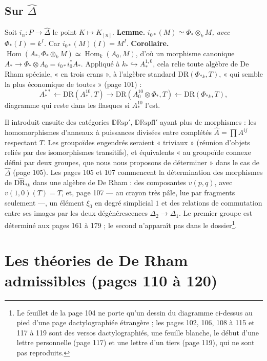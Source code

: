 \documentclass[11pt,a4paper]{article}
\begin{document}
\subsection*{Sur $\widehat{\Delta}$}

Soit $i_n : P \to \widehat{\Delta}$ le point $K \mapsto K_{[n]}$.
\textbf{Lemme.} \emph{$i_{0*}(M) \simeq \Phi_* \otimes_k M$, avec $\Phi_*(I) =
k^I$.} Car $i_{0*}(M)(I) = M^I$. \textbf{Corollaire.}
$\operatorname{Hom}(A_*, \Phi_* \otimes_k M) \simeq \operatorname{Hom}_k(A_0, M)$,
d'où un morphisme canonique $A_* \to \Phi_* \otimes A_0 = i_{0*}i_0^*A_*$.
Appliqué à $k_* \hookrightarrow A^{1,0}_*$, cela relie toute algèbre de De Rham
spéciale, « en trois crans », à l'algèbre standard $\mathrm{DR}(\Phi_{*k}, T)$,
« qui semble la plus économique de toutes » (page 101) :
\[
A^{**}_* \longleftarrow \mathrm{DR}(A^{10}_*, T) \longrightarrow \mathrm{DR}(A^{10}_0 \otimes \Phi_*, T) \longleftarrow \mathrm{DR}(\Phi_{*k}, T) ,
\]
diagramme qui reste dans les flasques si $A^{10}_*$ l'est.

Il introduit ensuite des catégories $\mathbb{DR}\mathrm{sp}'$,
$\mathbb{DR}\mathrm{spfl}'$ ayant plus de morphismes : les homomorphismes
d'anneaux à puissances divisées entre complétés $\widehat{A} = \prod A^{ij}$
respectant $T$. Les groupoïdes engendrés seraient « triviaux » (réunion
d'objets reliés par des isomorphismes transitifs), et équivalents « au
groupoïde connexe défini par deux groupes, que nous nous proposons de
déterminer » dans le cas de $\widehat{\Delta}$ (page 105). Les pages 105 et 107
commencent la détermination des morphismes de
$\widehat{\mathrm{DR}}_{*k}$ dans une algèbre de De Rham : des composantes
$v(p,q)$, avec $v(1,0)(T) = T$, et, page 107 — au crayon très pâle, lue par
fragments seulement —, un élément $\xi_0$ en degré simplicial $1$ et des
relations de commutation entre ses images par les deux dégénérescences
$\Delta_2 \to \Delta_1$. Le premier groupe est déterminé aux pages 161 à
179 ; le second n'apparaît pas dans le dossier\footnote{Le feuillet de la page
104 ne porte qu'un dessin du diagramme ci-dessus au pied d'une page
dactylographiée étrangère ; les pages 102, 106, 108 à 115 et 117 à 119 sont
des versos dactylographiés, une feuille blanche, le début d'une lettre
personnelle (page 117) et une lettre d'un tiers (page 119), qui ne sont pas
reproduits.}.

\section*{Les théories de De Rham admissibles (pages 110 à 120)}
\end{document}
